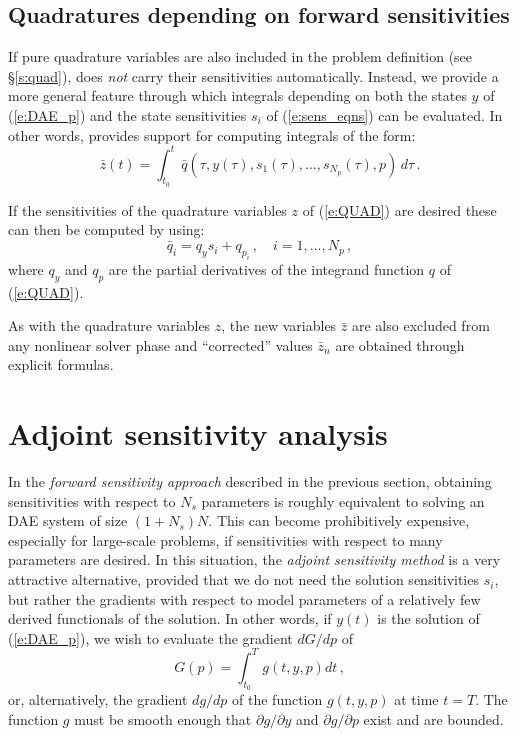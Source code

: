 \subsection{Quadratures depending on forward sensitivities}
If pure quadrature variables are also included in the problem definition
(see \S\ref{s:quad}), {\idas} does {\em not} carry their sensitivities 
automatically. Instead, we provide a more general feature through which
integrals depending on both the states $y$ of (\ref{e:DAE_p}) and the
state sensitivities $s_i$ of (\ref{e:sens_eqns}) can be evaluated. In other
words, {\idas} provides support for computing integrals of the form:
\begin{equation*}
 \bar z(t) = \int_{t_0}^t \bar q(\tau, y(\tau), s_1(\tau), \ldots, s_{N_p}(\tau),p) \, d\tau \, .
\end{equation*}

If the sensitivities of the quadrature variables $z$ of (\ref{e:QUAD}) are
desired these can then be computed by using:
\begin{equation*}
  \bar q_i = q_y s_i + q_{p_i} \, , \quad i = 1,\ldots,N_p \, ,
\end{equation*}
where $q_y$ and $q_p$ are the partial derivatives of the integrand function
$q$ of (\ref{e:QUAD}).

As with the quadrature variables $z$, the new variables $\bar z$ are also excluded
from any nonlinear solver phase and ``corrected'' values $\bar z_n$ are obtained
through explicit formulas. 


\section{Adjoint sensitivity analysis}\label{ss:adj_sensi}
In the {\em forward sensitivity approach} described in the previous
section, obtaining sensitivities with respect to $N_s$ parameters is roughly
equivalent to solving an DAE system of size $(1+N_s) N$. This can become 
prohibitively expensive, especially for large-scale problems, if sensitivities
with respect to many parameters are desired.
In this situation, the {\em adjoint sensitivity method} is a very
attractive alternative, provided that we do not need the solution sensitivities
$s_i$, but rather the gradients with respect to model parameters of a relatively 
few derived functionals of the solution. In other words, if $y(t)$ is the solution
of (\ref{e:DAE_p}), we wish to evaluate the gradient ${dG}/{dp}$ of
\begin{equation}\label{e:G}
G(p) = \int_{t_0}^T g(t, y, p) dt \, ,
\end{equation}
or, alternatively, the gradient ${dg}/{dp}$ of the function $g(t, y, p)$ 
at time $t=T$. 
The function $g$ must be smooth enough that $\partial g / \partial y$ 
and $\partial g / \partial p$ exist and are bounded. 

